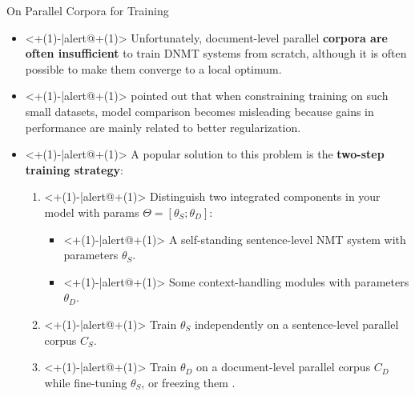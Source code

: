 \begin{frame}{On Parallel Corpora for Training}
	\begin{itemize}
		\item<+(1)-|alert@+(1)> Unfortunately, document-level parallel \textbf{corpora are often insufficient} to train DNMT systems from scratch, although it is often possible to make them converge to a local optimum. 
		\item<+(1)-|alert@+(1)> \cite{kim_when_2019, li_does_2020} pointed out that when constraining training on such small datasets, model comparison becomes misleading because gains in performance are mainly related to better regularization.
		\item<+(1)-|alert@+(1)> A popular solution to this problem is the \textbf{two-step training strategy}: \cite{tu_learning_2017,zhang_improving_2018,miculicich_document-level_2018}
		\begin{enumerate}
			\item<+(1)-|alert@+(1)> Distinguish two integrated components in your model with params $\Theta=[\theta_S;\theta_D]$:
				\begin{itemize}
					\item<+(1)-|alert@+(1)> A self-standing sentence-level NMT system with parameters $\theta_S$.
					\item<+(1)-|alert@+(1)> Some context-handling modules with parameters $\theta_D$.
				\end{itemize}
			\item<+(1)-|alert@+(1)> Train $\theta_S$ independently on a sentence-level parallel corpus $C_S$.
			\item<+(1)-|alert@+(1)> Train $\theta_D$ on a document-level parallel corpus $C_D$ while fine-tuning $\theta_S$, or freezing them \cite{zhang_improving_2018}.
		\end{enumerate}
	\end{itemize}
\end{frame}

